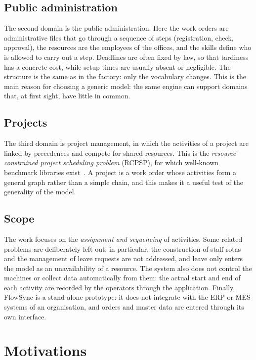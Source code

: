 \subsection{Public administration}
\label{sec:domain-pa}

The second domain is the public administration. Here the work orders are administrative files
that go through a sequence of steps (registration, check, approval), the resources are the
employees of the offices, and the skills define who is allowed to carry out a step. Deadlines are
often fixed by law, so that tardiness has a concrete cost, while setup times are usually absent or
negligible. The structure is the same as in the factory: only the vocabulary changes. This is
the main reason for choosing a generic model: the same engine can support domains that, at first
sight, have little in common.

\subsection{Projects}
\label{sec:domain-projects}

The third domain is project management, in which the activities of a project are linked by
precedences and compete for shared resources. This is the \emph{resource-constrained project
scheduling problem} (RCPSP), for which well-known benchmark libraries
exist~\cite{kolisch1997}. A project is a work order whose activities form a general graph rather
than a simple chain, and this makes it a useful test of the generality of the model.

\subsection{Scope}
\label{sec:scope}

The work focuses on the \emph{assignment and sequencing} of activities. Some related problems are
deliberately left out: in particular, the construction of staff rotas and the management of leave
requests are not addressed, and leave only enters the model as an unavailability of a resource.
The system also does not control the machines or collect data automatically from them: the actual
start and end of each activity are recorded by the operators through the application.
Finally, FlowSync is a stand-alone prototype: it does not integrate with the ERP or MES systems
of an organisation, and orders and master data are entered through its own interface.

\section{Motivations}
\label{sec:motivations}

